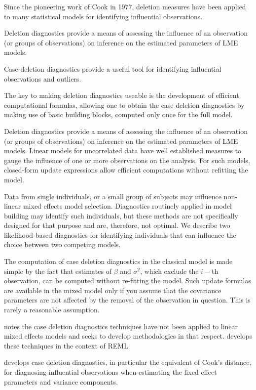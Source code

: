\documentclass[12pt, a4paper]{report}
\theoremstyle{plain}
\theoremstyle{definition}
\theoremstyle{remark}
\begin{document}
Since the pioneering work of Cook in 1977, deletion measures have been applied to many statistical models for identifying influential observations.

Deletion diagnostics provide a means of assessing the influence of an observation (or groups of observations) on inference on the estimated parameters of LME models.

Case-deletion diagnostics provide a useful tool for identifying influential observations and outliers.


The key to making deletion diagnostics useable is the development of efficient computational formulas, allowing one to obtain the  case deletion diagnostics by making use of basic building blocks, computed only once for the full model.

Deletion diagnostics provide a means of assessing the influence of an observation (or groups of observations) on inference on the estimated parameters of LME models. Linear models for uncorrelated data have well established measures to gauge the influence of one or more observations on the analysis. For such models, closed-form update expressions allow efficient computations without refitting the model.

Data from single individuals, or a small group of subjects may influence non-linear mixed effects model selection. Diagnostics routinely applied in model building may identify such individuals, but these methods are not specifically designed for that purpose and are, therefore, not optimal. We describe two likelihood-based diagnostics for identifying individuals that can influence the choice between two competing models.


The computation of case deletion diagnostics in the classical model is made simple by the fact that estimates of $\beta$ and $\sigma^2$, which exclude the $i-$th observation, can be computed without re-fitting the model. Such update formulas are available in the mixed model only if you assume that the covariance parameters are not affected by the removal of the observation in question. This is rarely a reasonable assumption.

\citet{Christiansen} notes the case deletion diagnostics techniques have not been applied to linear mixed effects models and seeks to develop methodologies in that respect. \citet{Christiansen} develops these techniques in the context of REML

\citet{Christiansen} develops  case deletion diagnostics, in particular the equivalent of  Cook's distance, for diagnosing influential observations when estimating the fixed effect parameters and variance components.
\end{document}
